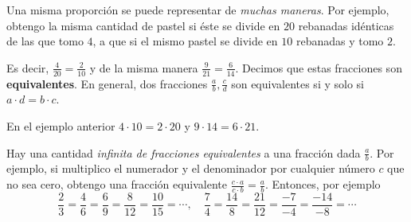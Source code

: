 Una misma proporción se puede representar de \emph{muchas maneras}. Por ejemplo, obtengo la misma cantidad de pastel si éste se divide en $20$ rebanadas idénticas de las que tomo $4$, a que si el mismo pastel se divide en $10$ rebanadas y tomo $2$. 

\hspace{2cm}
\hspace{2cm}
\hspace{2cm}

Es decir, $\frac{4}{20}=\frac{2}{10}$ y de la misma manera $\frac{9}{21}=\frac{6}{14}$. Decimos que estas fracciones son {\bf equivalentes}. En general, dos fracciones $\frac{a}{b}, \frac{c}{d}$ son equivalentes si y solo si $a\cdot d=b\cdot c$. 

En el ejemplo anterior $4\cdot 10 = 2 \cdot 20$ y $9\cdot 14 = 6 \cdot 21$.

Hay una cantidad \emph{infinita de fracciones equivalentes} a una fracción dada $\frac{a}{b}$. Por ejemplo, si multiplico el numerador y el denominador por cualquier número $c$ que no sea cero, obtengo una fracción equivalente $\frac{c\cdot a}{c \cdot b}=\frac{a}{b}$. Entonces, por ejemplo $$\frac{2}{3}=\frac{4}{6}=\frac{6}{9}=\frac{8}{12}=\frac{10}{15}=\cdots, \quad \frac{7}{4}=\frac{14}{8}=\frac{21}{12}=\frac{-7}{-4}=\frac{-14}{-8}=\cdots$$

